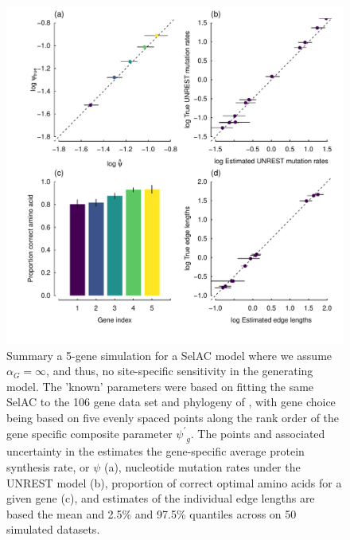 \documentclass{article}
\newcommand{\alphag}{\ensuremath{\alpha_G}\xspace}
\newcommand{\psiprime}{\ensuremath{\psi^\prime}\xspace}
\begin{document}
\begin{figure}[H]
  \centering
  \includegraphics[width=0.9\linewidth]{FIGURE_S3_5genes_ALL_UNREST_Selac_NoG.pdf}
  \caption{Summary a 5-gene simulation for a SelAC model where we assume $\alphag = \infty$, and thus, no site-specific sensitivity in the generating model.
		The 'known' parameters were based on fitting the same SelAC to the 106 gene data set and phylogeny of \citet{RokasEtAl2003}, with gene choice being based on five evenly spaced points along the rank order of the gene specific composite parameter $\psiprime_g$.
		The points and associated uncertainty in the estimates the gene-specific average protein synthesis rate, or $\psi$ (a), nucleotide mutation rates under the UNREST model (b), proportion of correct optimal amino acids for a given gene (c), and estimates of the individual edge lengths are based the mean and 2.5\% and 97.5\% quantiles across on 50 simulated datasets.
} 
  \label{fig:SelacNoGSimRes}
\end{figure}
\end{document}

